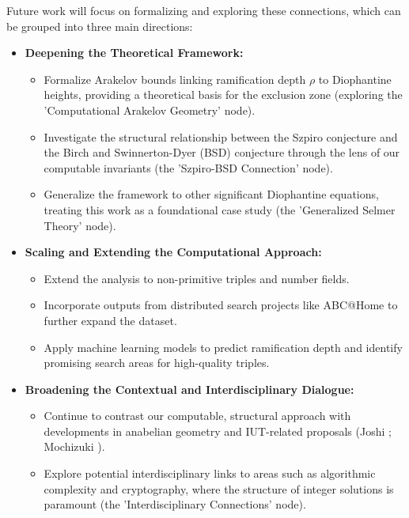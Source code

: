 \documentclass[11pt,a4paper]{article}
\begin{document}
Future work will focus on formalizing and exploring these connections, which can be grouped into three main directions:

\begin{itemize}
    \item \textbf{Deepening the Theoretical Framework:}
        \begin{itemize}
            \item Formalize Arakelov bounds linking ramification depth $\rho$ to Diophantine heights, providing a theoretical basis for the exclusion zone (exploring the 'Computational Arakelov Geometry' node).
            \item Investigate the structural relationship between the Szpiro conjecture and the Birch and Swinnerton-Dyer (BSD) conjecture through the lens of our computable invariants (the 'Szpiro-BSD Connection' node).
            \item Generalize the framework to other significant Diophantine equations, treating this work as a foundational case study (the 'Generalized Selmer Theory' node).
        \end{itemize}

    \item \textbf{Scaling and Extending the Computational Approach:}
        \begin{itemize}
            \item Extend the analysis to non-primitive triples and number fields.
            \item Incorporate outputs from distributed search projects like ABC@Home to further expand the dataset.
            \item Apply machine learning models to predict ramification depth and identify promising search areas for high-quality triples.
        \end{itemize}

    \item \textbf{Broadening the Contextual and Interdisciplinary Dialogue:}
        \begin{itemize}
            \item Continue to contrast our computable, structural approach with developments in anabelian geometry and IUT-related proposals (Joshi \cite{joshi2025}; Mochizuki \cite{mochizuki2021}).
            \item Explore potential interdisciplinary links to areas such as algorithmic complexity and cryptography, where the structure of integer solutions is paramount (the 'Interdisciplinary Connections' node).
        \end{itemize}
\end{itemize}
\end{document}
